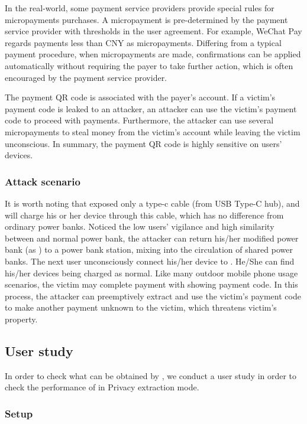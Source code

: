 In the real-world, some payment service providers provide special rules for micropayments purchases. A micropayment is pre-determined by the payment service provider with thresholds in the user agreement. For example, WeChat Pay regards payments less than CNY  as micropayments. Differing from a typical payment procedure, when micropayments are made, confirmations can be applied automatically without requiring the payer to take further action, which is often encouraged by the payment service provider.

The payment QR code is associated with the payer's account. If a victim's payment code is leaked to an attacker, an attacker can use the victim's payment code to proceed with payments. Furthermore, the attacker can use several micropayments to steal money from the victim's account while leaving the victim unconscious. In summary, the payment QR code is highly sensitive on users' devices.

\subsubsection{Attack scenario}

It is worth noting that \tool exposed only a type-c cable (from USB Type-C hub),
and \tool will charge his or her device through this cable, which has no difference from ordinary power banks. Noticed the low users' vigilance and high similarity between \tool and normal power bank, the attacker can return his/her modified power bank (as \tool) to a power bank station, mixing \tool into the circulation of shared power banks. The next user unconsciously connect his/her device to \tool. 
He/She can find his/her devices being charged as normal.
Like many outdoor mobile phone usage scenarios, the victim may complete payment with showing payment code. In this process, the attacker can preemptively extract and use the victim's payment code to make another payment unknown to the victim, which threatens victim's property.


\subsection{User study}

In order to check what can be obtained by \tool, we conduct a user study in order to check the performance of \tool in Privacy extraction mode.

\subsubsection{Setup}

